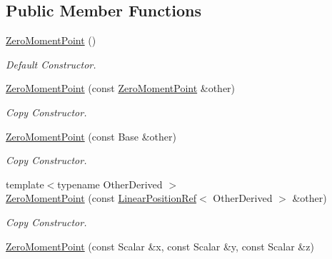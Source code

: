 \subsection*{Public Member Functions}
\begin{DoxyCompactItemize}
\item 
\hyperlink{classow__core_1_1ZeroMomentPoint_ac695f8f92a27bf3b355624e185aa1da4}{Zero\+Moment\+Point} ()\hypertarget{classow__core_1_1ZeroMomentPoint_ac695f8f92a27bf3b355624e185aa1da4}{}\label{classow__core_1_1ZeroMomentPoint_ac695f8f92a27bf3b355624e185aa1da4}

\begin{DoxyCompactList}\small\item\em Default Constructor. \end{DoxyCompactList}\item 
\hyperlink{classow__core_1_1ZeroMomentPoint_aef31e2404b6fdb2a1b92bca85ab2c61d}{Zero\+Moment\+Point} (const \hyperlink{classow__core_1_1ZeroMomentPoint}{Zero\+Moment\+Point} \&other)\hypertarget{classow__core_1_1ZeroMomentPoint_aef31e2404b6fdb2a1b92bca85ab2c61d}{}\label{classow__core_1_1ZeroMomentPoint_aef31e2404b6fdb2a1b92bca85ab2c61d}

\begin{DoxyCompactList}\small\item\em Copy Constructor. \end{DoxyCompactList}\item 
\hyperlink{classow__core_1_1ZeroMomentPoint_acecfb4839d16cc7a297f092e967e24b3}{Zero\+Moment\+Point} (const Base \&other)\hypertarget{classow__core_1_1ZeroMomentPoint_acecfb4839d16cc7a297f092e967e24b3}{}\label{classow__core_1_1ZeroMomentPoint_acecfb4839d16cc7a297f092e967e24b3}

\begin{DoxyCompactList}\small\item\em Copy Constructor. \end{DoxyCompactList}\item 
{\footnotesize template$<$typename Other\+Derived $>$ }\\\hyperlink{classow__core_1_1ZeroMomentPoint_a635c5446347aeb5a43c655c4ae0d3280}{Zero\+Moment\+Point} (const \hyperlink{classow__core_1_1LinearPositionRef}{Linear\+Position\+Ref}$<$ Other\+Derived $>$ \&other)\hypertarget{classow__core_1_1ZeroMomentPoint_a635c5446347aeb5a43c655c4ae0d3280}{}\label{classow__core_1_1ZeroMomentPoint_a635c5446347aeb5a43c655c4ae0d3280}

\begin{DoxyCompactList}\small\item\em Copy Constructor. \end{DoxyCompactList}\item 
\hyperlink{classow__core_1_1ZeroMomentPoint_a29264be17a950e76dd789a5495113b3d}{Zero\+Moment\+Point} (const Scalar \&x, const Scalar \&y, const Scalar \&z)\hypertarget{classow__core_1_1ZeroMomentPoint_a29264be17a950e76dd789a5495113b3d}{}\label{classow__core_1_1ZeroMomentPoint_a29264be17a950e76dd789a5495113b3d}


\end{DoxyCompactItemize}
